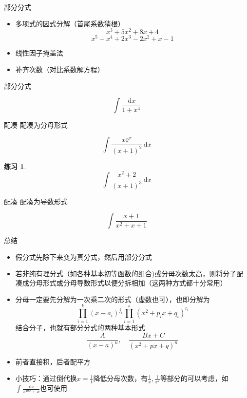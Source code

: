 \documentclass[UTF8]{ctexbeamer}
\def\diff{\,\mathrm{d}}
\newtheorem{exercise}[theorem]{练习} %
\begin{document}
\begin{frame}{部分分式}
\begin{itemize}
	\item 多项式的因式分解（首尾系数猜根）
	\[x^3+5x^2+8x+4\]
	\[x^5-x^4+2x^3-2x^2+x-1\]
	\item 线性因子掩盖法
	\item 补齐次数（对比系数解方程）
\end{itemize}
\end{frame}

\begin{frame}{部分分式}
\begin{example}
\[\int\frac{\diff x}{1+x^4}\]
\end{example}
\end{frame}

\begin{frame}{配凑}
配凑为分母形式
\begin{example}
\[\int\frac{x\mathbb{e}^x}{(x+1)^2}\diff x\]
\end{example}
\begin{exercise}
\[\int\frac{x^2+2}{(x+1)^3}\diff x\]
\end{exercise}
\end{frame}

\begin{frame}{配凑}
配凑为导数形式
\begin{example}
\[\int\frac{x+1}{x^2+x+1}\]
\end{example}
\end{frame}

\begin{frame}{总结}
\begin{itemize}
	\item 假分式先除下来变为真分式，然后用部分分式
	\item 若非纯有理分式（如各种基本初等函数的组合)或分母次数太高，则将分子配凑成分母形式或分母导数形式以便分拆相加（这两种方式都十分常用）
	\item 分母一定要先分解为一次乘二次的形式（虚数也可），也即分解为
		\[\prod_{i=1}^k(x-a_i)^{j_i}\prod_{i=1}^s(x^2+p_ix+q_i)^{l_i}\]
		结合分子，也就有部分分式的两种基本形式
		\[\frac{A}{(x-a)^n},\quad\frac{Bx+C}{(x^2+px+q)^n}\]
	\item 前者直接积，后者配平方
	\item 小技巧：通过倒代换$\displaystyle x=\frac{1}{t}$降低分母次数，有$\displaystyle\frac{1}{x},\frac{1}{x^2}$等部分的可以考虑，如$\displaystyle\int\frac{\diff x}{x^{100}+x}$也可使用
\end{itemize}
\end{frame}
\end{document}
